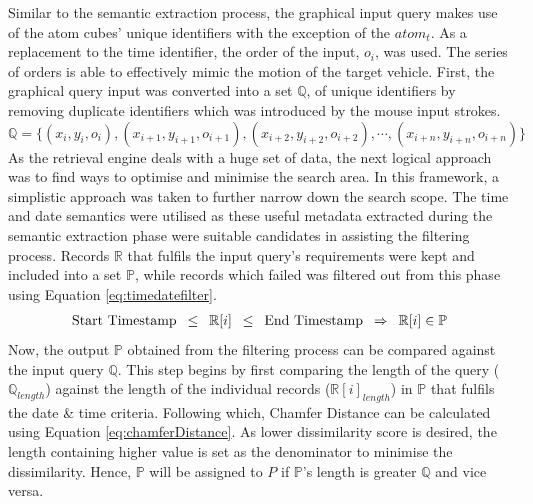 Similar to the semantic extraction process, the graphical input query makes use
of the atom cubes' unique identifiers with the exception of the $atom_t$. As a
replacement to the time identifier, the order of the input, $o_{i}$, was used.
The series of orders is able to effectively mimic the motion of the target
vehicle. First, the graphical query input was converted into a set
$\mathbb{Q}$, of unique identifiers by removing duplicate identifiers which
was introduced by the mouse input strokes.
\begin{equation}
    \mathbb{Q} = \{ (x_i, y_i, o_i), (x_{i+1}, y_{i+1}, o_{i+1}), (x_{i+2}, y_{i+2}, o_{i+2}), \dotsb,(x_{i+n}, y_{i+n}, o_{i+n})\}
\end{equation}
As the retrieval engine deals with a huge set of data, the next logical
approach was to find ways to optimise and minimise the search area. In this
framework, a simplistic approach was taken to further narrow down the search
scope.
The time and date semantics were utilised as these useful metadata extracted
during the semantic extraction phase were suitable candidates in assisting the
filtering process.
Records $\mathbb{R}$ that fulfils the input query's requirements were kept and
included into a set $\mathbb{P}$, while records which failed was filtered out
from this phase using Equation \ref{eq:timedatefilter}.
\begin{gather}
\label{eq:timedatefilter}
  \text{Start Timestamp} \hspace{.5em} \leq \hspace{.5em} \mathbb{R}[i] \hspace{.5em} \leq \hspace{.5em} \text{End Timestamp} \hspace{.5em} \Rightarrow \hspace{.5em} \mathbb{R}[i] \in \mathbb{P}
\end{gather}
Now, the output $\mathbb{P}$ obtained from the filtering process can be
compared against the input query $\mathbb{Q}$. This step begins by first
comparing the length of the query ($\mathbb{Q}_{length}$) against the length
of the individual records ($\mathbb{R}[i]_{length}$) in $\mathbb{P}$ that
fulfils the date \& time criteria.
Following which, Chamfer Distance can be calculated using Equation
\ref{eq:chamferDistance}. As lower dissimilarity score is desired, the length
containing higher value is set as the denominator to minimise the dissimilarity.
Hence, $\mathbb{P}$ will be assigned to $P$ if $\mathbb{P}$'s length is greater
$\mathbb{Q}$ and vice versa.

